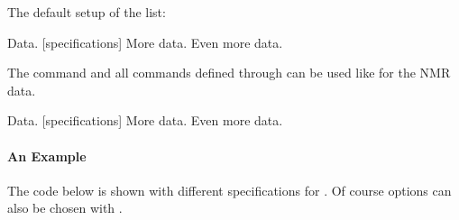\documentclass[load-preamble+]{cnltx-doc}
\begin{document}
The default setup of the list:
\begin{sourcecode}
  \topsep\z@skip \partopsep\z@skip 
  \itemsep\z@ \parsep\z@ \itemindent\z@
  \leftmargin\z@
\end{sourcecode}

\begin{example}
  \begin{experimental}[format=\bfseries]
     Data.
    [specifications] More data.
     Even more data.
  \end{experimental}
\end{example}

The command  and all commands defined through 
can be used like  for the NMR data.

\begin{example}
  \begin{experimental}[format=\bfseries,use-equal]
     Data.
    [specifications] More data.
    \NMR Even more data.
  \end{experimental}
\end{example}

\paragraph{An Example}
The code below is shown with different specifications for .
Of course options can also be chosen with .
\end{document}

